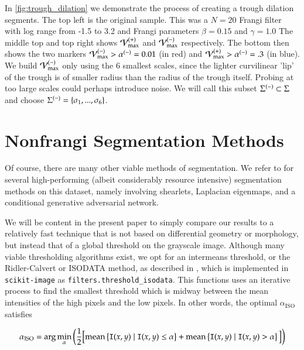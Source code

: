 In \cref{fig:trough_dilation} we demonstrate the process of creating a trough dilation segments. The top left is the original sample. This was a $N=20$ Frangi filter with log range from -1.5 to 3.2 and Frangi parameters $\beta=0.15$ and $\gamma=1.0$ The middle top and top right shows $\mathcal{V}_{\max}^{(+)}$ and $\mathcal{V}_{\max}^{(-)}$ respectively. The bottom then shows the two markers 
 $\mathcal{V}_{\max}^{(-)} > \alpha^{(-)} = 0.01$ (in red) and
 $\mathcal{V}_{\max}^{(+)} > \alpha^{(-)} = .3$ (in blue). We build $\mathcal{V}_{\max}^{(-)}$ only using the 6 smallest scales, since the lighter curvilinear 'lip' of the trough is of smaller radius than the radius of the trough itself. Probing at too large scales could perhaps introduce noise. We will call this subset $\Sigma^{(-)} \subset \Sigma $ and choose $\Sigma^{(-)}=\{\sigma_1 , ... , \sigma_6\}$.
 
 
 
 


\section{Nonfrangi Segmentation Methods}

Of course, there are many other viable methods of segmentation. We refer to \cite{anghel2018placental} for several high-performing (albeit considerably resource intensive) segmentation methods on this dataset, namely involving shearlets, Laplacian eigenmaps, and a conditional generative adversarial network.

We will be content in the present paper to simply compare our results to a relatively fast technique that is not based on differential geometry or morphology, but instead that of a global threshold on the grayscale image. Although many viable thresholding algorithms exist, we opt for an intermeans threshold, or the Ridler-Calvert or ISODATA method, as described in \cite{isodata}, which is implemented in \texttt{scikit-image} as \texttt{filters.threshold\_isodata}. This functions uses an iterative process to find the smallest threshold which is midway between the mean intensities of the high pixels and the low pixels. In other words, the optimal $\alpha_{\textrm{ISO}}$ satisfies

\begin{equation} \label{eq:ISODATA}
\alpha_{\textrm{ISO}} = \arg\min_{\alpha} \left( \frac{1}{2} \Big[
\textrm{mean}\left\{ \mathtt{I}(x,y) \;|\; \mathtt{I}(x,y) \le \alpha \right\} 
+
\textrm{mean}\left\{ \mathtt{I}(x,y) \;|\; \mathtt{I}(x,y) >   \alpha \right\}
 \Big]
 \right)
\end{equation}

